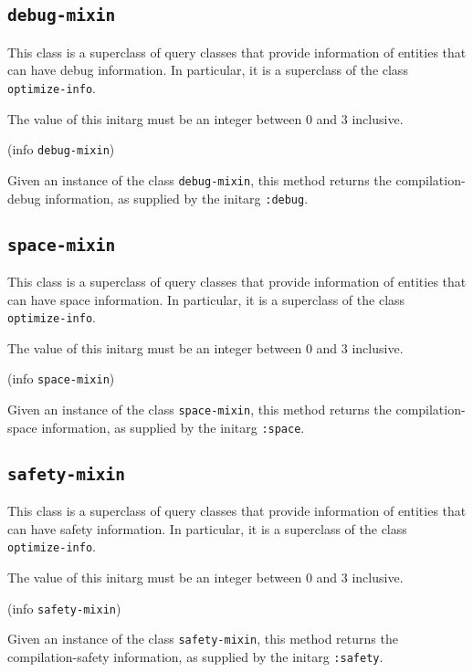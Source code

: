 \subsection{\texttt{debug-mixin}}

This class is a superclass of query classes that provide information
of entities that can have debug information.  In particular, it is a
superclass of the class \texttt{optimize-info}.


The value of this initarg must be an integer between $0$ and $3$
inclusive.

 {(info {\tt debug-mixin})}

Given an instance of the class \texttt{debug-mixin}, this method
returns the compilation-debug information, as supplied by the initarg
\texttt{:debug}.

\subsection{\texttt{space-mixin}}

This class is a superclass of query classes that provide information
of entities that can have space information.  In particular, it is a
superclass of the class \texttt{optimize-info}.


The value of this initarg must be an integer between $0$ and $3$
inclusive.

 {(info {\tt space-mixin})}

Given an instance of the class \texttt{space-mixin}, this method
returns the compilation-space information, as supplied by the initarg
\texttt{:space}.

\subsection{\texttt{safety-mixin}}

This class is a superclass of query classes that provide information
of entities that can have safety information.  In particular, it is a
superclass of the class \texttt{optimize-info}.


The value of this initarg must be an integer between $0$ and $3$
inclusive.

 {(info {\tt safety-mixin})}

Given an instance of the class \texttt{safety-mixin}, this method
returns the compilation-safety information, as supplied by the initarg
\texttt{:safety}.

